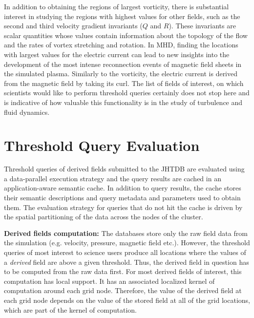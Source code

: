 \documentclass{sig-alternate}
\begin{document}
In addition to obtaining the regions of largest vorticity, there is substantial interest in studying the regions with highest values for other fields, such as
the second and third velocity gradient invariants ($Q$ and $R$). These invariants are scalar quantities whose values contain information about the 
topology of the flow and the rates of vortex stretching and rotation. In MHD, finding the locations with largest values for the electric current
can lead to new insights into the development of the most intense reconnection events of magnetic field sheets in the simulated plasma. Similarly to
the vorticity, the electric current is derived from the magnetic field by taking its curl. The list of fields of interest, on which scientists would like to perform 
threshold queries certainly does not stop here and is indicative of how valuable this functionality is in the study of turbulence and fluid dynamics.

\section{Threshold Query Evaluation}

Threshold queries of derived fields submitted to the JHTDB are evaluated using a data-parallel execution strategy and the query results are 
cached in an application-aware semantic cache. 
In addition to query results, the cache stores their semantic descriptions and query metadata and parameters used to obtain them.
The evaluation strategy for queries that do not hit the cache is driven by the spatial partitioning of the data across the nodes of the cluster.

{\bf Derived fields computation:} The databases store only the raw field data from the simulation (e.g. velocity, pressure, magnetic field etc.). However,
the threshold queries of most interest to science users produce all locations where the values of a \emph{derived} field are above a given threshold. Thus, the
derived field in question has to be computed from the raw data first. For most derived fields of interest, this computation has local support. It has an 
associated localized kernel of computation around each grid node. Therefore, the value of the derived field at each grid node depends on the value of the
stored field at all of the grid locations, which are part of the kernel of computation. 
\end{document}
